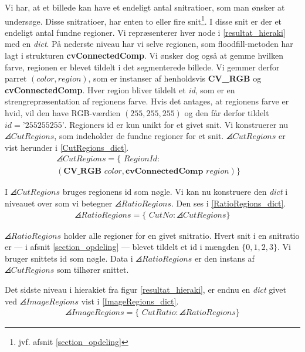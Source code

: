 {Vi har, at et billede kan have et endeligt antal snitratioer, som man
ønsker at undersøge. Disse snitratioer, har enten to eller fire
snit\footnote{jvf. afsnit \ref{section_opdeling}}. I disse snit er der
et endeligt antal fundne regioner. Vi repræsenterer hver node i
\ref{resultat_hieraki} med en \emph{dict}. På nederste niveau har vi
selve regionen, som floodfill-metoden har lagt i strukturen
\textbf{cvConnectedComp}. Vi ønsker dog også at gemme hvilken farve,
regionen er blevet tildelt i det segmenterede billede. Vi gemmer
derfor parret $(color, region)$, som er instanser af henholdsvis
\textbf{CV\_RGB} og \textbf{cvConnectedComp}. Hver region bliver tildelt
et \emph{id}, som er en strengrepræsentation af regionens farve.  Hvis
det antages, at regionens farve er hvid, vil den have RGB-værdien $(255,
255, 255)$ og den får derfor tildelt $id = \textrm{'255255255'}$.
Regioners id er kun unikt for et givet snit. Vi konstruerer nu
$\angles{CutRegions}$, som indeholder de fundne regioner for et snit.
$\angles{CutRegions}$ er vist herunder i \eqref{CutRegions_dict}.
\begin{multline}
    \angles{CutRegions} = \{ \textit{~RegionId} : \\
    (\textbf{CV\_RGB~}\textit{color}, \textbf{cvConnectedComp~}\textit{region}) \}\quad
    \label{CutRegions_dict}
\end{multline}

\noindent I $\angles{CutRegions}$ bruges regionens id som nøgle. Vi kan nu
konstruere den \emph{dict} i niveauet over som vi betegner
$\angles{RatioRegions}$. Den ses i \eqref{RatioRegions_dict}.
\begin{eqnarray}
    \angles{RatioRegions} = \{ \textit{~CutNo} : \angles{CutRegions} \}
    \label{RatioRegions_dict}
\end{eqnarray}

\noindent $\angles{RatioRegions}$ holder alle regioner for en givet
snitratio.  Hvert snit i en snitratio er  --- i afsnit
\ref{section_opdeling}  --- blevet tildelt et id i mængden
$\{0,1,2,3\}$. Vi bruger snittets id som nøgle.  Data i
$\angles{RatioRegions}$ er den instans af $\angles{CutRegions}$ som
tilhører snittet.

Det sidste niveau i hierakiet fra figur \ref{resultat_hieraki}, er endnu
en \emph{dict} givet ved $\angles{ImageRegions}$ vist i
\eqref{ImageRegions_dict}.
\begin{eqnarray}
    \angles{ImageRegions} = \{ \textit{~CutRatio} : \angles{RatioRegions} \}
    \label{ImageRegions_dict}
\end{eqnarray}

}
